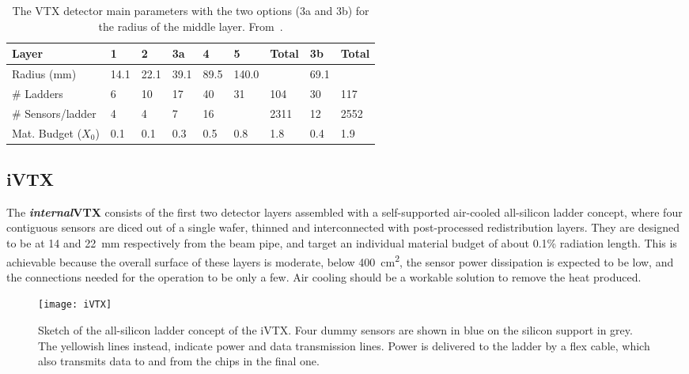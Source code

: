 \begin{table}[h!]
\centering
\begin{tabular}{C{3cm}|C{0.8cm}|C{0.8cm}|C{0.8cm}|C{0.8cm}|C{1.2cm}||C{1.2cm}|C{0.8cm}||C{1.2cm}}
\hline
\hline
Layer & 1 & 2 & 3a & 4 & 5 & Total & 3b & Total \\
\hline
\hline
Radius (mm) & 14.1 & 22.1 & 39.1 & 89.5 & 140.0 & & 69.1 & \\
\hline
\# Ladders & 6 & 10 & 17 & 40 & 31 & 104 & 30 & 117 \\
\hline
\# Sensors/ladder & 4 & 4 & 7 & 16 &  & 2311 & 12 & 2552 \\
\hline
Mat. Budget ($X_{0}$) & 0.1 & 0.1 & 0.3 & 0.5 & 0.8 & 1.8 & 0.4 & 1.9 \\
\hline
\hline
\end{tabular}
\caption{The VTX detector main parameters with the two options (3a and 3b) for the radius of the middle layer. From~\cite{F.Forti:3930}.}
\label{tab:layers_tab}
\end{table}


\subsection{iVTX}

The \textbf{\textit{internal}VTX} consists of the first two detector layers assembled with a self-supported air-cooled all-silicon ladder concept, where four contiguous sensors are diced out of a single wafer, thinned and interconnected with post-processed redistribution layers. They are designed to be at 14 and \SI{22}{mm} respectively from the beam pipe, and target an individual material budget of about 0.1\% radiation length. 
This is achievable because the overall surface of these layers is moderate, below \SI{400}{cm^{2}}, the sensor power dissipation is expected to be low, and the connections needed for the operation to be only a few. Air cooling should be a workable solution to remove the heat produced.


\begin{figure}[h!]
\centering
\texttt{[image: iVTX]}
\caption{Sketch of the all-silicon ladder concept of the iVTX. Four dummy sensors are shown in blue on the silicon support in grey. The yellowish lines instead, indicate power and data transmission lines. Power is delivered to the ladder by a flex cable, which also transmits data to and from the chips in the final one.}
\label{fig:iVTX}
\end{figure}

